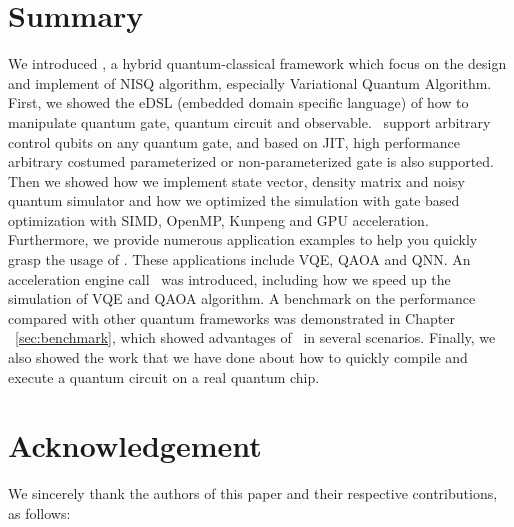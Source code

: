 \documentclass[pra,twocolumn,superscriptaddress,floatfix,nofootinbib,amsmath,amssymb]{revtex4-1}
\numberwithin{equation}{section}
\numberwithin{figure}{section}
\numberwithin{table}{section}
\begin{document}
% 

\section{Summary}
\label{sec:summary}
We introduced \MindQuantum, a hybrid quantum-classical framework which focus on the design and implement of NISQ algorithm, especially Variational Quantum Algorithm. First, we showed the eDSL (embedded domain specific language) of how to manipulate quantum gate, quantum circuit and observable. \MindQuantum\ support arbitrary control qubits on any quantum gate, and based on JIT, high performance arbitrary costumed parameterized or non-parameterized gate is also supported. Then we showed how we implement state vector, density matrix and noisy quantum simulator and how we optimized the simulation with gate based optimization with SIMD, OpenMP, Kunpeng and GPU acceleration. Furthermore, we provide numerous application examples to help you quickly grasp the usage of \MindQuantum. These applications include VQE, QAOA and QNN. An acceleration engine call \QuPack\ was introduced, including how we speed up the simulation of VQE and QAOA algorithm. A benchmark on the performance compared with other quantum frameworks was demonstrated in Chapter ~\ref{sec:benchmark}, which showed advantages of \MindQuantum\ in several scenarios. Finally, we also showed the work that we have done about how to quickly compile and execute a quantum circuit on a real quantum chip.

\section{Acknowledgement}
\label{sec:acknowledgement}
We sincerely thank the authors of this paper and their respective contributions, as follows:
\end{document}

